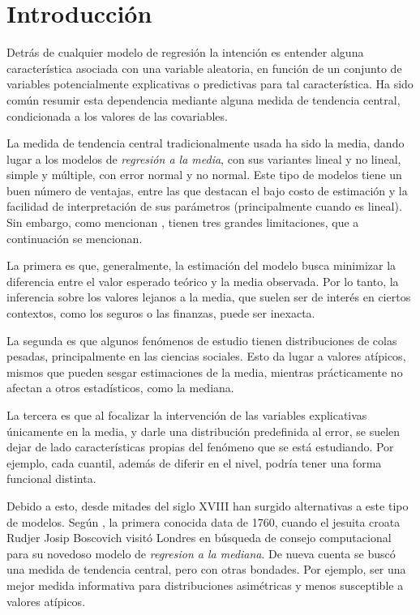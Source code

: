 \chapter{Introducci\'on}

Detr\'as de cualquier modelo de regresi\'on la intenci\'on es entender alguna caracter\'istica asociada con una variable aleatoria, en funci\'on de un conjunto de variables potencialmente explicativas o predictivas para tal caracter\'istica. Ha sido com\'un resumir esta dependencia mediante alguna medida de tendencia central, condicionada a los valores de las covariables.

La medida de tendencia central tradicionalmente usada ha sido la media, dando lugar a los modelos de \textit{regresi\'on a la media}, con sus variantes lineal y no lineal, simple y m\'ultiple, con error normal y no normal. Este tipo de modelos tiene un buen n\'umero de ventajas, entre las que destacan el bajo costo de estimaci\'on y la facilidad de interpretaci\'on de sus par\'ametros (principalmente cuando es lineal). Sin embargo, como mencionan \cite{Hao_FrecQuantReg}, tienen tres grandes limitaciones, que a continuaci\'on se mencionan.

La primera es que, generalmente, la estimaci\'on del modelo busca minimizar la diferencia entre el valor esperado te\'orico y la media observada. Por lo tanto, la inferencia sobre los valores lejanos a la media, que suelen ser de inter\'es en ciertos contextos, como los seguros o las finanzas, puede ser inexacta.

La segunda es que algunos fen\'omenos de estudio tienen distribuciones de colas pesadas, principalmente en las ciencias sociales. Esto da lugar a valores at\'ipicos, mismos que pueden sesgar estimaciones de la media, mientras prácticamente no afectan a otros estadísticos, como la mediana.

La tercera es que al focalizar la intervenci\'on de las variables explicativas \'unicamente en la media, y darle una distribución predefinida al error, se suelen dejar de lado caracter\'isticas propias del fen\'omeno que se est\'a estudiando. Por ejemplo, cada cuantil, adem\'as de diferir en el nivel, podr\'ia tener una forma funcional distinta.

Debido a esto, desde mitades del siglo XVIII han surgido alternativas a este tipo de modelos. Seg\'un \cite{Hao_FrecQuantReg}, la primera conocida data de 1760, cuando el jesuita croata Rudjer Josip Boscovich visit\'o Londres en b\'usqueda de consejo computacional para su novedoso modelo de \textit{regresi\’on a la mediana}. De nueva cuenta se busc\'o una medida de tendencia central, pero con otras bondades. Por ejemplo, ser una mejor medida informativa para distribuciones asim\'etricas y menos susceptible a valores at\'ipicos. 

